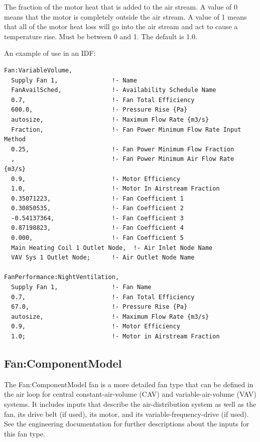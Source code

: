 The fraction of the motor heat that is added to the air stream. A value of 0 means that the motor is completely outside the air stream. A value of 1 means that all of the motor heat loss will go into the air stream and act to cause a temperature rise. Must be between 0 and 1. The default is 1.0.

An example of use in an IDF:

\begin{lstlisting}
Fan:VariableVolume,
  Supply Fan 1,               !- Name
  FanAvailSched,              !- Availability Schedule Name
  0.7,                        !- Fan Total Efficiency
  600.0,                      !- Pressure Rise {Pa}
  autosize,                   !- Maximum Flow Rate {m3/s}
  Fraction,                   !- Fan Power Minimum Flow Rate Input Method
  0.25,                       !- Fan Power Minimum Flow Fraction
  ,                           !- Fan Power Minimum Air Flow Rate {m3/s}
  0.9,                        !- Motor Efficiency
  1.0,                        !- Motor In Airstream Fraction
  0.35071223,                 !- Fan Coefficient 1
  0.30850535,                 !- Fan Coefficient 2
  -0.54137364,                !- Fan Coefficient 3
  0.87198823,                 !- Fan Coefficient 4
  0.000,                      !- Fan Coefficient 5
  Main Heating Coil 1 Outlet Node,  !- Air Inlet Node Name
  VAV Sys 1 Outlet Node;      !- Air Outlet Node Name

FanPerformance:NightVentilation,
  Supply Fan 1,               !- Fan Name
  0.7,                        !- Fan Total Efficiency
  67.0,                       !- Pressure Rise {Pa}
  autosize,                   !- Maximum Flow Rate {m3/s}
  0.9,                        !- Motor Efficiency
  1.0;                        !- Motor in Airstream Fraction
\end{lstlisting}

\subsection{Fan:ComponentModel}\label{fancomponentmodel}

The Fan:ComponentModel fan is a more detailed fan type that can be defined in the air loop for central constant-air-volume (CAV) and variable-air-volume (VAV) systems. It includes inputs that describe the air-distribution system as well as the fan, its drive belt (if used), its motor, and its variable-frequency-drive (if used). See the engineering documentation for further descriptions about the inputs for this fan type.

